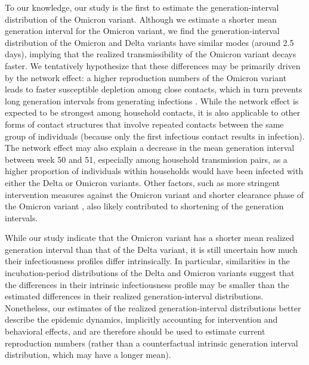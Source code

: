 \documentclass[12pt]{article}
\begin{document}
To our knowledge, our study is the first to estimate the generation-interval distribution of the Omicron variant.
Although we estimate a shorter mean generation interval for the Omicron variant, we find the generation-interval distribution of the Omicron and Delta variants have similar modes (around 2.5 days), implying that the realized transmissibility of the Omicron variant decays faster.
We tentatively hypothesize that these differences may be primarily driven by the network effect: a higher reproduction numbers of the Omicron variant leads to faster susceptible depletion among close contacts, which in turn prevents long generation intervals from generating infections \citep{park2020inferring,hart2022generation}. 
While the network effect is expected to be strongest among household contacts, it is also applicable to other forms of contact structures that involve repeated contacts between the same group of individuals (because only the first infectious contact results in infection).
The network effect may also explain a decrease in the mean generation interval between week 50 and 51, especially among household transmission pairs, as a higher proportion of individuals within households would have been infected with either the Delta or Omicron variants.
Other factors, such as more stringent intervention measures against the Omicron variant \citep{backer2021omicron} and shorter clearance phase of the Omicron variant \citep{hay2022viral}, also likely contributed to shortening of the generation intervals.

While our study indicate that the Omicron variant has a shorter mean realized generation interval than that of the Delta variant, it is still uncertain how much their infectiousness profiles differ intrinsically.
In particular, similarities in the incubation-period distributions of the Delta and Omicron variants suggest that the differences in their intrinsic infectiousness profile may be smaller than the estimated differences in their realized generation-interval distributions.
Nonetheless, our estimates of the realized generation-interval distributions better describe the epidemic dynamics, implicitly accounting for intervention and behavioral effects, and are therefore should be used to estimate current reproduction numbers (rather than a counterfactual intrinsic generation interval distribution, which may have a longer mean).
\end{document}
